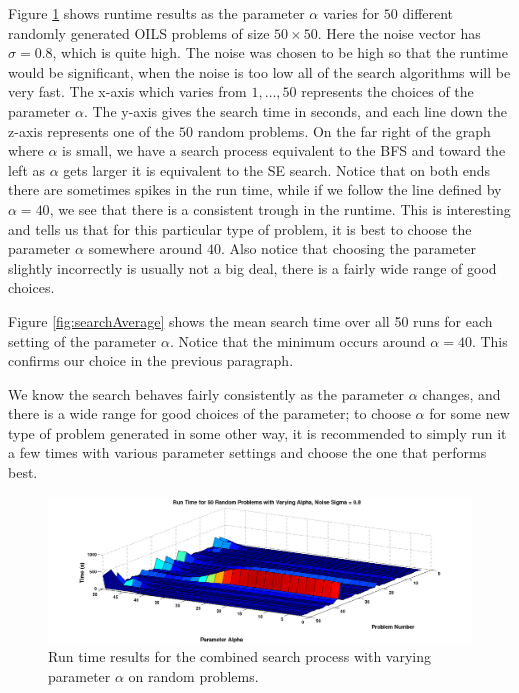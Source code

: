 \documentclass[12pt,Bold,letterpaper]{mcgilletdclass}
\begin{document}
Figure \ref{fig:searchsurface} shows runtime results as the parameter $\alpha$ varies for $50$ different randomly generated OILS problems of size $50 \times 50$. Here the noise vector has $\sigma = 0.8$, which is quite high. The noise was chosen to be high so that the runtime would be significant, when the noise is too low all of the search algorithms will be very fast. The x-axis which varies from $1 , \dots, 50$ represents the choices of the parameter $\alpha$. The y-axis gives the search time in seconds, and each line down the z-axis represents one of the $50$ random problems. On the far right of the graph where $\alpha$ is small, we have a search process equivalent to the BFS and toward the left as $\alpha$ gets larger it is equivalent to the  SE search. Notice that on both ends there are sometimes spikes in the run time, while if we follow the line defined by $\alpha = 40$, we see that there is a consistent trough in the runtime. This is interesting and tells us that for this particular type of problem, it is best to choose the parameter $\alpha$ somewhere around $40$. Also notice that choosing the parameter slightly incorrectly is usually not a big deal, there is a fairly wide range of good choices. 

Figure \ref{fig:searchAverage} shows the mean search time over all 50 runs for each setting of the parameter $\alpha$. Notice that the minimum occurs around $\alpha = 40$. This confirms our choice in the previous paragraph.

We know the search behaves fairly consistently as the parameter $\alpha$ changes, and there is a wide range for good choices of the parameter; to choose $\alpha$ for some new type of problem generated in some other way, it is recommended to simply run it a few times with various parameter settings and choose the one that performs best.

\begin{figure}
\centering
\includegraphics[scale=0.36]{searchsurface.png}
\caption{Run time results for the combined search process with varying parameter $\alpha$ on random problems.}
\label{fig:searchsurface}
\end{figure}
\end{document}
